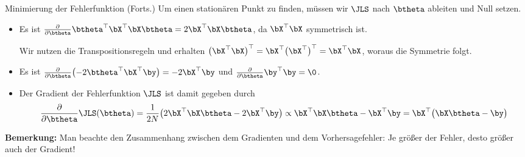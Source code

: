 \begin{frame}{Minimierung der Fehlerfunktion (Forts.)}{}
	Um einen stationären Punkt zu finden, müssen wir $\JLS$ nach $\btheta$ ableiten und Null setzen.

	\begin{itemize}
		\item Es ist $\frac{\partial}{\partial \btheta} \btheta^\top \bX^\top \bX \btheta = 2 \bX^\top \bX \btheta$,
			da $\bX^\top \bX$ symmetrisch ist. \\ \vspace*{2mm}
		\begin{myproof}
			Wir nutzen die Transpositionsregeln und erhalten $\bigl( \bX^\top \bX \bigr)^\top =
			\bX^\top \bigl( \bX^\top \bigr)^\top = \bX^\top \bX$, woraus die Symmetrie folgt.
		\end{myproof} \vspace*{2mm}
		\item Es ist $\frac{\partial}{\partial \btheta} \bigl( -2 \btheta^\top \bX^\top \by \bigr) = -2 \bX^\top \by$
			und $\frac{\partial}{\partial \btheta} \by^\top \by = \0$.
		\item Der Gradient der Fehlerfunktion $\JLS$ ist damit gegeben durch
		\begin{equation*}
			\frac{\partial}{\partial \btheta} \JLS(\btheta)
				= \frac{1}{2 N} \bigl( 2 \bX^\top \bX \btheta - 2 \bX^\top \by \bigr)
				\propto \bX^\top \bX \btheta - \bX^\top \by
				= \bX^\top \bigl( \bX \btheta - \by \bigr)
		\end{equation*}
	\end{itemize}
	
	\begin{boxGray}
		\textbf{Bemerkung:} Man beachte den Zusammenhang zwischen dem Gradienten und dem Vorhersagefehler:
		Je größer der Fehler, desto größer auch der Gradient!
	\end{boxGray}
\end{frame}


